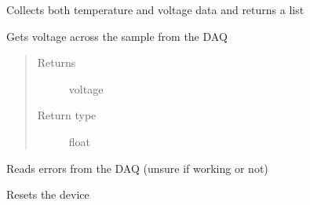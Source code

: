 \documentclass[letterpaper,10pt,english]{sphinxmanual}
\begin{document}
\begin{fulllineitems}
\begin{fulllineitems}
\label{\detokenize{source/laboratory.drivers:laboratory.drivers.daq.DAQ.get_thermopower}}
Collects both temperature and voltage data and returns a list

\end{fulllineitems}


\begin{fulllineitems}
\label{\detokenize{source/laboratory.drivers:laboratory.drivers.daq.DAQ.get_voltage}}
Gets voltage across the sample from the DAQ
\begin{quote}\begin{description}
\item[{Returns}] \leavevmode
voltage

\item[{Return type}] \leavevmode
float

\end{description}\end{quote}

\end{fulllineitems}


\begin{fulllineitems}
\label{\detokenize{source/laboratory.drivers:laboratory.drivers.daq.DAQ.read_errors}}
Reads errors from the DAQ (unsure if working or not)

\end{fulllineitems}


\begin{fulllineitems}
\label{\detokenize{source/laboratory.drivers:laboratory.drivers.daq.DAQ.reset}}
Resets the device

\end{fulllineitems}


\end{fulllineitems}
\end{document}
